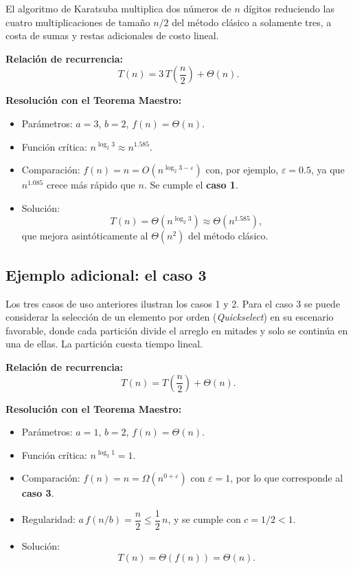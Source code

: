 \documentclass{article}
\begin{document}
        El algoritmo de Karatsuba multiplica dos números de $n$ dígitos reduciendo las
        cuatro multiplicaciones de tamaño $n/2$ del método clásico a solamente tres,
        a costa de sumas y restas adicionales de costo lineal.
        
        \textbf{Relación de recurrencia:}
        \[
        T(n) = 3\,T\!\left(\frac{n}{2}\right) + \Theta(n).
        \]
        
        \textbf{Resolución con el Teorema Maestro:}
        
        \begin{itemize}
        \item Parámetros: $a = 3$, $b = 2$, $f(n) = \Theta(n)$.
        \item Función crítica: $n^{\log_2 3} \approx n^{1.585}$.
        \item Comparación: $f(n) = n = O\!\left(n^{\log_2 3 - \varepsilon}\right)$
                con, por ejemplo, $\varepsilon = 0.5$, ya que $n^{1.085}$ crece más
                rápido que $n$. Se cumple el \textbf{caso 1}.
        \item Solución:
                \[
                T(n) = \Theta\!\left(n^{\log_2 3}\right) \approx \Theta\!\left(n^{1.585}\right),
                \]
                que mejora asintóticamente al $\Theta(n^2)$ del método clásico.
        \end{itemize}
        
        \subsection{Ejemplo adicional: el caso 3}
        
        Los tres casos de uso anteriores ilustran los casos 1 y 2. Para el caso 3 se
        puede considerar la selección de un elemento por orden (\emph{Quickselect}) en
        su escenario favorable, donde cada partición divide el arreglo en mitades y
        solo se continúa en una de ellas. La partición cuesta tiempo lineal.
        
        \textbf{Relación de recurrencia:}
        \[
        T(n) = T\!\left(\frac{n}{2}\right) + \Theta(n).
        \]
        
        \textbf{Resolución con el Teorema Maestro:}
        
        \begin{itemize}
        \item Parámetros: $a = 1$, $b = 2$, $f(n) = \Theta(n)$.
        \item Función crítica: $n^{\log_2 1} = 1$.
        \item Comparación: $f(n) = n = \Omega\!\left(n^{0+\varepsilon}\right)$ con
                $\varepsilon = 1$, por lo que corresponde al \textbf{caso 3}.
        \item Regularidad: $a\,f(n/b) = \dfrac{n}{2} \leq \dfrac{1}{2}\,n$, y se
                cumple con $c = 1/2 < 1$.
        \item Solución:
                \[
                T(n) = \Theta(f(n)) = \Theta(n).
                \]
        \end{itemize}
        
\end{document}
